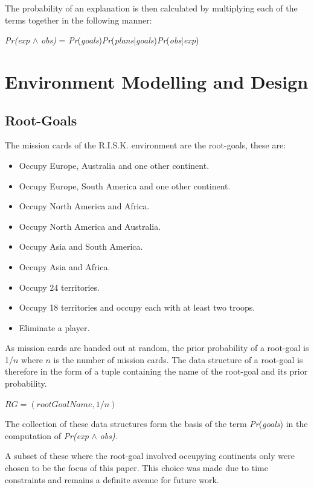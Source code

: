 \documentclass[parskip]{cs4rep}
\begin{document}
The probability of an explanation is then calculated by multiplying each of the terms together in the following manner: \newline

\centerline{
\textit{Pr(exp} $\wedge$ \textit{obs)} = \textit{Pr}(\textit{goals})\textit{Pr}(\textit{plans}|\textit{goals})\textit{Pr}(\textit{obs}|\textit{exp})
}

\section{Environment Modelling and Design}

\subsection{Root-Goals}

The mission cards of the R.I.S.K. environment are the root-goals, these are:

\begin{itemize}
\item
Occupy Europe, Australia and one other continent.
\item
Occupy Europe, South America and one other continent.
\item
Occupy North America and Africa.
\item
Occupy North America and Australia.
\item
Occupy Asia and South America.
\item
Occupy Asia and Africa.
\item
Occupy 24 territories.
\item
Occupy 18 territories and occupy each with at least two troops.
\item
Eliminate a player.
\end{itemize}

As mission cards are handed out at random, the prior probability of a root-goal is 1/$n$ where $n$ is the number of mission cards. The data structure of a root-goal is therefore in the form of a tuple containing the name of the root-goal and its prior probability.

\centerline{
 $RG = ( rootGoalName, 1/n)$\newline
}

The collection of these data structures form the basis of the term \textit{Pr}(\textit{goals}) in the computation of \textit{Pr(exp} $\wedge$ \textit{obs)}.

A subset of these where the root-goal involved occupying continents only were chosen to be the focus of this paper. This choice was made due to time constraints and remains a definite avenue for future work. 
\end{document}
